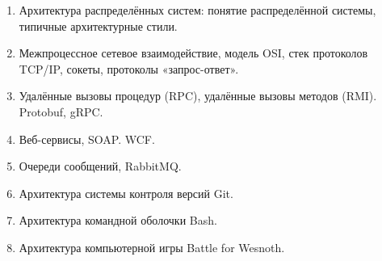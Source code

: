 \documentclass[a5paper]{article}
\begin{document}
\begin{enumerate}
    \item Архитектура распределённых систем: понятие распределённой системы, типичные архитектурные стили.
    \item Межпроцессное сетевое взаимодействие, модель OSI, стек протоколов TCP/IP, сокеты, протоколы «запрос-ответ».
    \item Удалённые вызовы процедур (RPC), удалённые вызовы методов (RMI). Protobuf, gRPC.
    \item Веб-сервисы, SOAP. WCF.
    \item Очереди сообщений, RabbitMQ.
    \item Архитектура системы контроля версий Git.
    \item Архитектура командной оболочки Bash.
    \item Архитектура компьютерной игры Battle for Wesnoth.
\end{enumerate}
\end{document}
